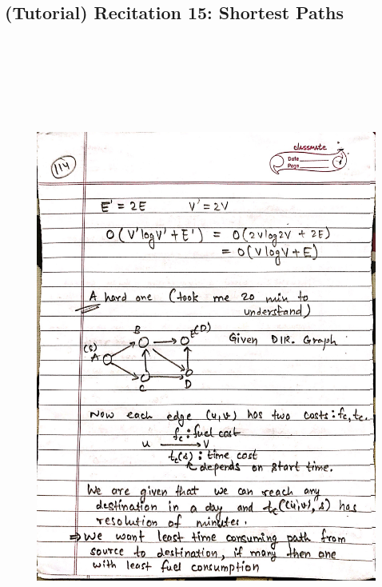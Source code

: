 \newpage
{\color{black} \subsection*{(Tutorial) Recitation 15: Shortest Paths}}
\begin{figure}[H]
    \centering
    \includegraphics[width=16cm, height=21cm]{"./MIT-6.006/MIT-6006-114"}
\end{figure}

